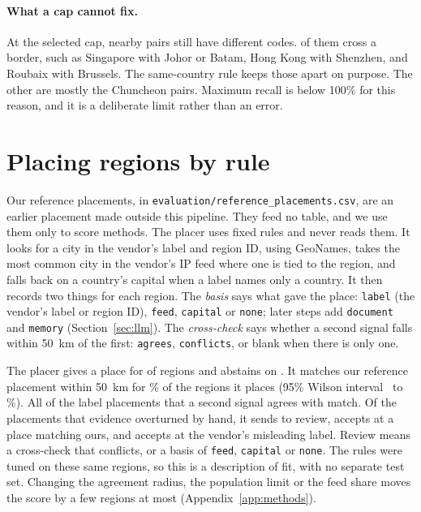 \documentclass[10pt,twocolumn]{article}
\newcommand{\code}[1]{\texttt{#1}}
\begin{document}
\paragraph{What a cap cannot fix.} At the selected cap, \capSplits{} nearby pairs still have different codes. \capBorderSplits{} of them cross a border, such as Singapore with Johor or Batam, Hong Kong with Shenzhen, and Roubaix with Brussels. The same-country rule keeps those apart on purpose. The other \capOtherSplits{} are mostly the Chuncheon pairs. Maximum recall is below 100\% for this reason, and it is a deliberate limit rather than an error.

\section{Placing regions by rule}
\label{sec:placer}

Our reference placements, in \code{evaluation/reference\_placements.csv}, are an earlier placement made outside this pipeline. They feed no table, and we use them only to score methods. The placer uses fixed rules and never reads them. It looks for a city in the vendor's label and region ID, using GeoNames, takes the most common city in the vendor's IP feed where one is tied to the region, and falls back on a country's capital when a label names only a country. It then records two things for each region. The \emph{basis} says what gave the place: \code{label} (the vendor's label or region ID), \code{feed}, \code{capital} or \code{none}; later steps add \code{document} and \code{memory} (Section~\ref{sec:llm}). The \emph{cross-check} says whether a second signal falls within 50~km of the first: \code{agrees}, \code{conflicts}, or blank when there is only one.

The placer gives a place for \placerPlaced{} of \placerRegions{} regions and abstains on \placerAbstained{}. It matches our reference placement within 50~km for \placerAccuracy{}\% of the regions it places (95\% Wilson interval~\citep{wilson1927probable,brown2001interval} \placerAllLow{} to \placerAllHigh{}\%). All \placerAgreedMatched{} of the \placerAgreedRegions{} label placements that a second signal agrees with match. Of the \placerOverturnedTotal{} placements that evidence overturned by hand, it sends \placerOverturnedFlagged{} to review, accepts \placerOverturnedMatching{} at a place matching ours, and accepts \placerOverturnedAccepted{} at the vendor's misleading label. Review means a cross-check that conflicts, or a basis of \code{feed}, \code{capital} or \code{none}. The rules were tuned on these same regions, so this is a description of fit, with no separate test set. Changing the agreement radius, the population limit or the feed share moves the score by a few regions at most (Appendix~\ref{app:methods}).
\end{document}

